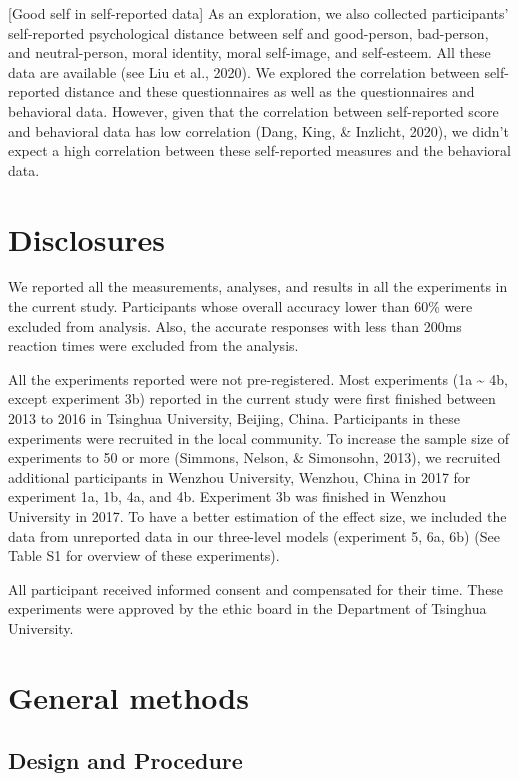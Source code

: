 \documentclass[
  english,
  man]{apa6}
\begin{document}
{[}Good self in self-reported data{]}
As an exploration, we also collected participants' self-reported psychological distance between self and good-person, bad-person, and neutral-person, moral identity, moral self-image, and self-esteem. All these data are available (see Liu et al., 2020). We explored the correlation between self-reported distance and these questionnaires as well as the questionnaires and behavioral data. However, given that the correlation between self-reported score and behavioral data has low correlation (Dang, King, \& Inzlicht, 2020), we didn't expect a high correlation between these self-reported measures and the behavioral data.

\hypertarget{disclosures}{%
\section{Disclosures}\label{disclosures}}

We reported all the measurements, analyses, and results in all the experiments in the current study. Participants whose overall accuracy lower than 60\% were excluded from analysis. Also, the accurate responses with less than 200ms reaction times were excluded from the analysis.

All the experiments reported were not pre-registered. Most experiments (1a \textasciitilde{} 4b, except experiment 3b) reported in the current study were first finished between 2013 to 2016 in Tsinghua University, Beijing, China. Participants in these experiments were recruited in the local community. To increase the sample size of experiments to 50 or more (Simmons, Nelson, \& Simonsohn, 2013), we recruited additional participants in Wenzhou University, Wenzhou, China in 2017 for experiment 1a, 1b, 4a, and 4b. Experiment 3b was finished in Wenzhou University in 2017. To have a better estimation of the effect size, we included the data from unreported data in our three-level models (experiment 5, 6a, 6b) (See Table S1 for overview of these experiments).

All participant received informed consent and compensated for their time. These experiments were approved by the ethic board in the Department of Tsinghua University.

\hypertarget{general-methods}{%
\section{General methods}\label{general-methods}}

\hypertarget{design-and-procedure}{%
\subsection{Design and Procedure}\label{design-and-procedure}}
\end{document}
